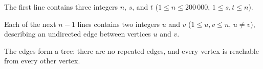 The first line contains three integers $n$, $s$, and $t$ ($1 \le n \le 200\,000$, $1 \le s,t \le n$).

Each of the next $n-1$ lines contains two integers $u$ and $v$ ($1 \le u,v \le n$, $u \ne v$), describing an undirected edge between vertices $u$ and $v$.

The edges form a tree: there are no repeated edges, and every vertex is reachable from every other vertex.
